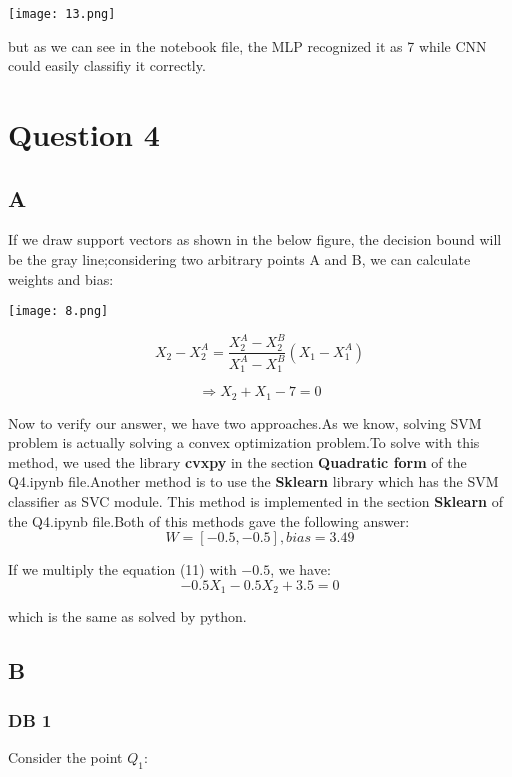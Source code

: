 \documentclass{article}
\begin{document}
\texttt{[image: 13.png]}

but as we can see in the notebook file, the MLP recognized it as 7 while CNN could easily classifiy it correctly.



\section*{Question 4}
\subsection*{A}
If we draw support vectors as shown in the below figure, the decision bound will be the gray line;considering two arbitrary points A and B, we can calculate weights and bias:

\texttt{[image: 8.png]}

\begin{equation*}
    X_{2} - X_{2}^{A} = \frac{X_{2}^{A} - X_{2}^{B}}{X_{1}^{A} - X_{1}^{B}}(X_{1} - X_{1}^{A})
\end{equation*}

\begin{equation}
    \Rightarrow X_{2} + X_{1} - 7 = 0
\end{equation}

Now to verify our answer, we have two approaches.As we know, solving SVM problem is actually solving a convex optimization problem.To solve with this method, we used the library
\textbf{cvxpy} in the section \textbf{Quadratic form} of the Q4.ipynb file.Another method is to use the \textbf{Sklearn} library which has the SVM classifier as SVC module.
This method is implemented in the section \textbf{Sklearn} of the Q4.ipynb file.Both of this methods gave the following answer:
\begin{equation*}
    W = [-0.5, -0.5], bias = 3.49
\end{equation*}

If we multiply the equation (11) with $-0.5$, we have:
\begin{equation*}
    -0.5X_{1} -0.5X_{2} + 3.5 = 0
\end{equation*}

which is the same as solved by python.

\subsection*{B}
\subsubsection*{DB 1}
Consider the point $Q_{1}$:
\end{document}
